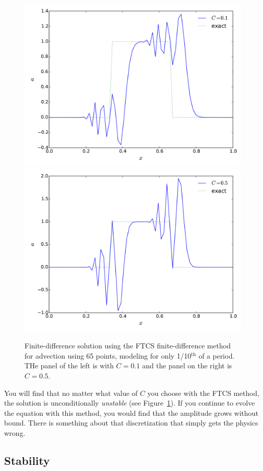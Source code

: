 \begin{figure}[t]
\centering
\includegraphics[width=0.48\linewidth]{fdadvect-FTCS-C0_1}
\includegraphics[width=0.48\linewidth]{fdadvect-FTCS-C0_5}
\caption[FTCS finite-difference solution to linear advection]
{\label{fig:fdadvect-ftcs} Finite-difference solution using the FTCS
finite-difference method for advection using 65 points, modeling for
only 1/10$^\mathrm{th}$ of a period.  THe panel of the left is
with $C = 0.1$ and the panel on the right is $C = 0.5$.\\
}
\end{figure}

You will find that no matter what value of $C$ you choose with the
FTCS method, the solution is unconditionally {\em unstable} (see
Figure~\ref{fig:fdadvect-ftcs}).  If you continue to evolve the
equation with this method, you would find that the amplitude grows
without bound.  There is something about that discretization that
simply gets the physics wrong.


\subsection{Stability}

